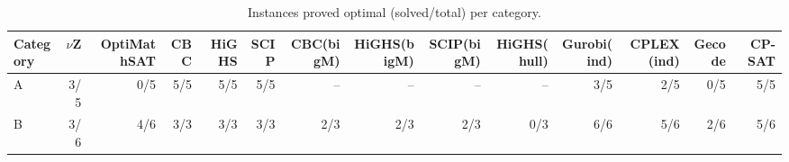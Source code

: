 \begin{table}[t]
\centering
\caption{Instances proved optimal (solved/total) per category.}
\label{tab:exp-solved}
\small
\begin{tabular}{@{}lrrrrrrrrrrrrr@{}}
\toprule
Category & $\nu$Z & OptiMathSAT & CBC & HiGHS & SCIP & CBC(bigM) & HiGHS(bigM) & SCIP(bigM) & HiGHS(hull) & Gurobi(ind) & CPLEX(ind) & Gecode & CP-SAT \\
\midrule
A & 3/5 & 0/5 & 5/5 & 5/5 & 5/5 & -- & -- & -- & -- & 3/5 & 2/5 & 0/5 & 5/5 \\
B & 3/6 & 4/6 & 3/3 & 3/3 & 3/3 & 2/3 & 2/3 & 2/3 & 0/3 & 6/6 & 5/6 & 2/6 & 5/6 \\
\bottomrule
\end{tabular}
\end{table}
